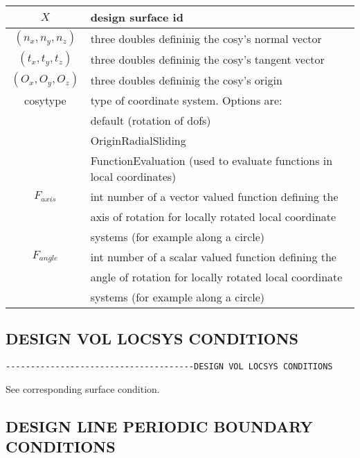\begin{center}
\begin{tabular}{c||l}
$X$                        & design surface id \\ \hline
$\left(n_x,n_y,n_z\right)$ & three doubles defininig the cosy's normal vector \\\hline
$\left(t_x,t_y,t_z\right)$ & three doubles defininig the cosy's tangent vector \\\hline
$\left(O_x,O_y,O_z\right)$ & three doubles defininig the cosy's origin \\\hline
cosytype                   & type of coordinate system. Options are: \\
                           & default (rotation of dofs) \\
                           & OriginRadialSliding \\
                           & FunctionEvaluation (used to evaluate functions in local coordinates)\\ \hline
$F_{axis}$                 & int number of a vector valued function defining the \\
                           & axis of rotation for locally rotated local coordinate \\
                           & systems (for example along a circle) \\ \hline
$F_{angle}$                & int number of a scalar valued function defining the \\
                           & angle of rotation for locally rotated local coordinate \\
                           & systems (for example along a circle) \\
\end{tabular}
\end{center}

\subsection{DESIGN VOL LOCSYS CONDITIONS}
\begin{verbatim}
--------------------------------------DESIGN VOL LOCSYS CONDITIONS
\end{verbatim}
See corresponding surface condition.

\subsection{DESIGN LINE PERIODIC BOUNDARY CONDITIONS}

